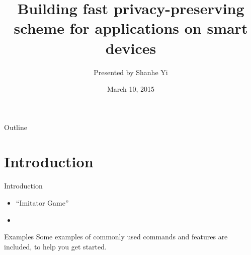 \documentclass{beamer}
\title[GSR2015]{Building fast privacy-preserving scheme for applications on smart devices}
\author{Presented by Shanhe Yi}
\institute{ Computer Science \\ College of William and Mary}
\date{March 10, 2015}
\begin{document}
\begin{frame}
  \titlepage
\end{frame}





\begin{frame}{Outline}
  \tableofcontents
\end{frame}













\section{Introduction}

\begin{frame}{Introduction}

\begin{itemize}
  \item ``Imitator Game''
  \item 
\end{itemize}

\vskip 1cm

\begin{block}{Examples}
Some examples of commonly used commands and features are included, to help you get started.
\end{block}

\end{frame}
\end{document}
